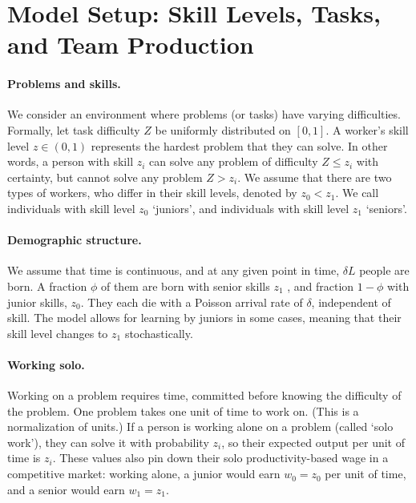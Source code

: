 \documentclass[12pt]{article}
\begin{document}
\section{Model Setup: Skill Levels, Tasks, and Team Production}\label{model-setup-skill-levels-tasks-and-team-production}

\paragraph{Problems and skills.} We consider an environment where problems (or tasks) have varying difficulties. Formally, let task difficulty \(Z\) be uniformly distributed on \([0,1]\). A worker's skill level \(z\in(0,1)\) represents the hardest problem that they can solve. In other words, a person with skill \(z_i\) can solve any problem of difficulty \(Z \leq z_i\) with certainty, but cannot solve any problem $Z>z_i$. We assume that there are two types of workers, who differ in their skill levels, denoted by $z_0<z_1$. We call individuals with skill level $z_0$ `juniors', and individuals with skill level $z_1$ `seniors'.  

\paragraph{Demographic structure.} We assume that time is continuous, and at any given point in time, $\delta L$ people are born. A fraction $\phi$ of them are born with senior skills $z_1$ , and fraction $1-\phi$ with junior skills, $z_0$. They each die with a Poisson arrival rate of $\delta$, independent of skill. The model allows for learning by juniors in some cases, meaning that their skill level changes to $z_1$ stochastically. 

\paragraph{Working solo.} Working on a problem requires time, committed before knowing the difficulty of the problem. One problem takes one unit of time to work on. (This is a normalization of units.) If a person is working alone on a problem (called `solo work'), they can solve it with probability $z_i$, so their expected output per unit of time is $z_i$. These values also pin down their solo productivity-based wage in a competitive market: working alone, a junior would earn \(w_0 = z_0\) per unit of time, and a senior would earn \(w_1 = z_1\).
\end{document}
